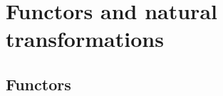 


\newpage
\section{Functors and natural transformations}
\label{sec:funct-natur-transf}

\subsection{Functors}
\label{sec:functors}

